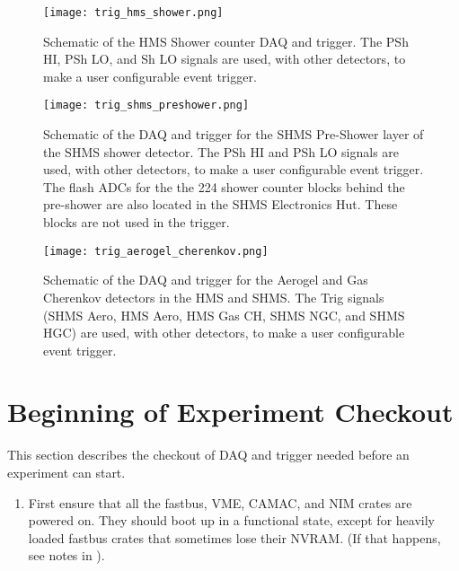 {{\begin{figure}
\texttt{[image: trig\_hms\_shower.png]}
\caption{\label{fig:trig_hms_shower}
Schematic of the HMS Shower counter DAQ and trigger.  The PSh HI, PSh LO,
and Sh LO signals are used, with other detectors, to make a user
configurable event trigger.
}
\end{figure}

\begin{figure}
\texttt{[image: trig\_shms\_preshower.png]}
\caption{\label{fig:trig_shms_preshower}
Schematic of the DAQ and trigger for the SHMS Pre-Shower layer of the
SHMS shower detector.  The
PSh HI and PSh LO signals are used, with other detectors, to make a user
configurable event trigger.  The flash ADCs for the the 224 shower counter
blocks behind the pre-shower are also located in the SHMS Electronics Hut.
These blocks are not used in the trigger.
}
\end{figure}

\begin{figure}
\texttt{[image: trig\_aerogel\_cherenkov.png]}
\caption{\label{fig:trig_aerogel_cherenkov}
Schematic of the DAQ and trigger for the Aerogel and Gas Cherenkov
detectors in the HMS and SHMS.  The Trig signals (SHMS Aero, HMS Aero,
HMS Gas CH, SHMS NGC, and SHMS HGC) are used, with other detectors, to
make a user configurable event trigger.
}
\end{figure}



\section{Beginning of Experiment Checkout}

\par
This section describes the
checkout of DAQ and trigger
needed before an experiment can start.

\begin{enumerate}
\item{First ensure that all the fastbus, VME,
CAMAC, and NIM crates are powered
on. They should
boot up in a functional state, except for
heavily loaded fastbus crates that sometimes
lose their NVRAM.  (If that happens, see notes
in ).}



\end{enumerate}}}
